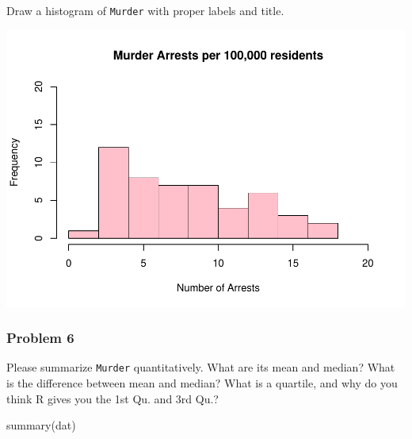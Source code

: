 \documentclass[
]{article}
\newenvironment{Shaded}{\begin{snugshade}}{\end{snugshade}}
\newcommand{\AttributeTok}[1]{\textcolor[rgb]{0.77,0.63,0.00}{#1}}
\newcommand{\DecValTok}[1]{\textcolor[rgb]{0.00,0.00,0.81}{#1}}
\newcommand{\FunctionTok}[1]{\textcolor[rgb]{0.00,0.00,0.00}{#1}}
\newcommand{\NormalTok}[1]{#1}
\newcommand{\SpecialCharTok}[1]{\textcolor[rgb]{0.00,0.00,0.00}{#1}}
\newcommand{\StringTok}[1]{\textcolor[rgb]{0.31,0.60,0.02}{#1}}
\begin{document}
Draw a histogram of \texttt{Murder} with proper labels and title.

\begin{Shaded}
\end{Shaded}

\includegraphics{Assignments_files/figure-latex/unnamed-chunk-5-1.pdf}

\hypertarget{problem-6}{%
\subsubsection{Problem 6}\label{problem-6}}

Please summarize \texttt{Murder} quantitatively. What are its mean and
median? What is the difference between mean and median? What is a
quartile, and why do you think R gives you the 1st Qu. and 3rd Qu.?

\begin{Shaded}
\begin{Highlighting}[]
\FunctionTok{summary}\NormalTok{(dat)}
\end{Highlighting}
\end{Shaded}
\end{document}
